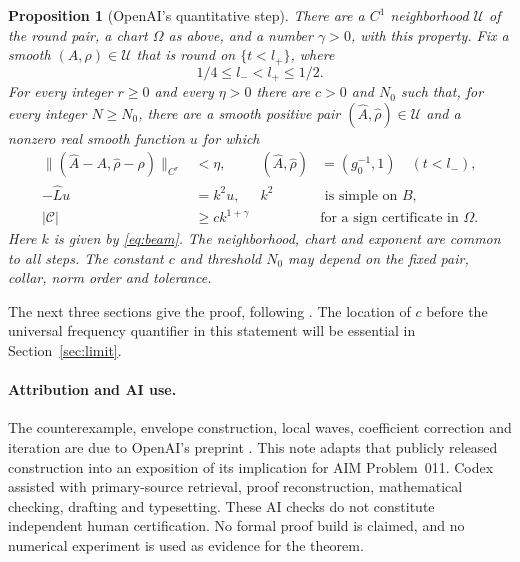 \documentclass[11pt]{article}
\newtheorem{proposition}[theorem]{Proposition}
\theoremstyle{definition}
\theoremstyle{remark}
\numberwithin{equation}{section}
\begin{document}
\begin{proposition}[OpenAI's quantitative step]\label{prop:step}
There are a \(C^1\) neighborhood \(\mathcal U\) of the round pair,
a chart \(\Omega\) as above, and a number \(\gamma>0\), with this
property. Fix a smooth \((A,\rho)\in\mathcal U\) that is round on
\(\{t<l_+\}\), where
\[
 1/4\le l_-<l_+\le1/2.
\]
For every integer \(r\ge0\) and every \(\eta>0\) there are \(c>0\)
and \(N_0\) such that, for every integer \(N\ge N_0\), there are a
smooth positive pair \((\widehat A,\widehat\rho)\in\mathcal U\) and
a nonzero real smooth function \(u\) for which
\begin{align}
 \|(\widehat A-A,\widehat\rho-\rho)\|_{C^r}&<\eta,
 &(\widehat A,\widehat\rho)&=(g_0^{-1},1)\quad(t<l_-),\label{eq:stepmove}\\
 -\widehat L u&=k^2u,
 &k^2&\text{ is simple on }B,\label{eq:stepexact}\\
 |\mathcal C|&\ge c k^{1+\gamma}
 &&\text{for a sign certificate in }\Omega.\label{eq:stepsigns}
\end{align}
Here \(k\) is given by \eqref{eq:beam}. The neighborhood, chart and
exponent are common to all steps. The constant \(c\) and threshold
\(N_0\) may depend on the fixed pair, collar, norm order and tolerance.
\end{proposition}

The next three sections give the proof, following
\cite[Proposition~2.2 and Sections~3--5]{OpenAI2026}.
The location of \(c\) before the universal frequency quantifier in this
statement will be essential in Section~\ref{sec:limit}.






\paragraph{Attribution and AI use.}
The counterexample, envelope construction, local waves, coefficient
correction and iteration are due to OpenAI's preprint \cite{OpenAI2026}.
This note adapts that publicly released construction into an exposition
of its implication for AIM Problem~011. Codex assisted with primary-source
retrieval, proof reconstruction, mathematical checking, drafting and
typesetting. These AI checks do not constitute independent human
certification. No formal proof build is claimed, and no numerical
experiment is used as evidence for the theorem.
\end{document}
